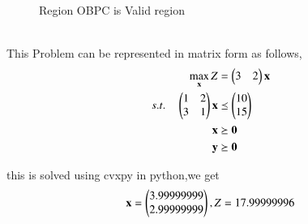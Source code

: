 \begin{enumerate}[label=\thesection.\arabic*.,ref=\thesection.\theenumi]
\begin{enumerate}
\begin{figure}[h]
    \caption{Region OBPC is Valid region}
    \label{fig:Figure_1}
    \end{figure}\\
    
    This Problem can be represented in matrix form as follows,\\
    \begin{align}
        \max_{\mathbf{x}} Z &= \begin{pmatrix}3 & 2\end{pmatrix}\mathbf{x}\\
        s.t. \quad 
        \begin{pmatrix}
        1 & 2\\
        3 & 1
        \end{pmatrix}
        \mathbf{x} &\preceq \begin{pmatrix}10\\15\end{pmatrix} \\
        \mathbf{x} &\succeq \mathbf{0}\\
        \mathbf{y} &\succeq \mathbf{0}
    \end{align}
    
    this is solved using cvxpy in python,we get \\
    \begin{align}
    \mathbf{x} = \begin{pmatrix}3.99999999\\2.99999999\end{pmatrix}, Z = 17.99999996
    \end{align}
\end{enumerate}

\end{enumerate}